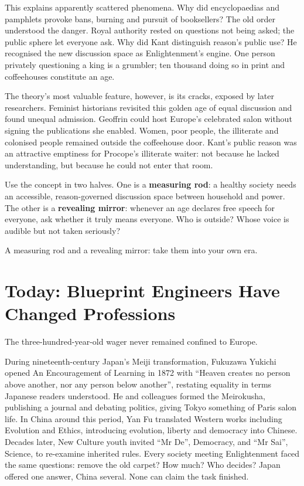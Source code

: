 This explains apparently scattered phenomena. Why did encyclopaedias and pamphlets provoke bans, burning and pursuit of booksellers? The old order understood the danger. Royal authority rested on questions not being asked; the public sphere let everyone ask. Why did Kant distinguish reason's public use? He recognised the new discussion space as Enlightenment's engine. One person privately questioning a king is a grumbler; ten thousand doing so in print and coffeehouses constitute an age.

The theory's most valuable feature, however, is its cracks, exposed by later researchers. Feminist historians revisited this golden age of equal discussion and found unequal admission. Geoffrin could host Europe's celebrated salon without signing the publications she enabled. Women, poor people, the illiterate and colonised people remained outside the coffeehouse door. Kant's public reason was an attractive emptiness for Procope's illiterate waiter: not because he lacked understanding, but because he could not enter that room.

Use the concept in two halves. One is a \textbf{measuring rod}: a healthy society needs an accessible, reason-governed discussion space between household and power. The other is a \textbf{revealing mirror}: whenever an age declares free speech for everyone, ask whether it truly means everyone. Who is outside? Whose voice is audible but not taken seriously?

A measuring rod and a revealing mirror: take them into your own era.

\section[Today's Designers]{Today: Blueprint Engineers Have Changed Professions}
The three-hundred-year-old wager never remained confined to Europe.

During nineteenth-century Japan's Meiji transformation, Fukuzawa Yukichi opened An Encouragement of Learning in 1872 with ``Heaven creates no person above another, nor any person below another'', restating equality in terms Japanese readers understood. He and colleagues formed the Meirokusha, publishing a journal and debating politics, giving Tokyo something of Paris salon life. In China around this period, Yan Fu translated Western works including Evolution and Ethics, introducing evolution, liberty and democracy into Chinese. Decades later, New Culture youth invited ``Mr De'', Democracy, and ``Mr Sai'', Science, to re-examine inherited rules. Every society meeting Enlightenment faced the same questions: remove the old carpet? How much? Who decides? Japan offered one answer, China several. None can claim the task finished.

